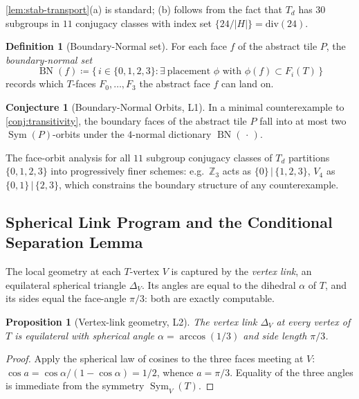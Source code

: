 \documentclass[11pt,a4paper]{article}
\theoremstyle{plain}
\newtheorem{proposition}[proposition]{Proposition}
\theoremstyle{definition}
\newtheorem{definition}[definition]{Definition}
\newtheorem{conjecture}[conjecture]{Conjecture}
\theoremstyle{remark}
\DeclareMathOperator{\Sym}{Sym}
\DeclareMathOperator{\BN}{BN}
\newcommand{\Td}{T_{\!d}}
\newcommand{\Z}{\mathbb{Z}}
\begin{document}
\cref{lem:stab-transport}(a) is standard; (b) follows from the fact that
$\Td$ has $30$ subgroups in $11$ conjugacy classes with index set
$\{24/|H|\} = \mathrm{div}(24)$.

\begin{definition}[Boundary-Normal set]\label{def:bn}
For each face $f$ of the abstract tile $P$, the \emph{boundary-normal set}
\[
  \BN(f) \coloneqq \bigl\{\, i \in \{0,1,2,3\}
          : \exists\ \text{placement } \phi \text{ with }
          \phi(f) \subset F_{i}(T) \,\bigr\}
\]
records which $T$-faces $F_{0},\ldots,F_{3}$ the abstract face $f$ can land
on.
\end{definition}

\begin{conjecture}[Boundary-Normal Orbits, L1]\label{conj:bn-orbits}
In a minimal counterexample to \cref{conj:transitivity}, the boundary faces
of the abstract tile $P$ fall into at most two $\Sym(P)$-orbits under the
$4$-normal dictionary $\BN(\,\cdot\,)$.
\end{conjecture}

The face-orbit analysis for all $11$ subgroup conjugacy classes of $\Td$
partitions $\{0,1,2,3\}$ into progressively finer schemes: e.g.\ $\Z_{3}$
acts as $\{0\}\,|\,\{1,2,3\}$, $V_{4}$ as $\{0,1\}\,|\,\{2,3\}$, which
constrains the boundary structure of any counterexample.

\subsection{Spherical Link Program and the Conditional Separation Lemma}
\label{ssec:spherical-link}

The local geometry at each $T$-vertex $V$ is captured by the \emph{vertex
link}, an equilateral spherical triangle $\Delta_{V}$.  Its angles are equal
to the dihedral $\alpha$ of $T$, and its sides equal the face-angle $\pi/3$:
both are exactly computable.

\begin{proposition}[Vertex-link geometry, L2]\label{prop:vertex-link}
The vertex link $\Delta_{V}$ at every vertex of $T$ is equilateral with
spherical angle $\alpha = \arccos(1/3)$ and side length $\pi/3$.
\end{proposition}

\begin{proof}
Apply the spherical law of cosines to the three faces meeting at $V$:
$\cos a = \cos\alpha/(1 - \cos\alpha) = 1/2$, whence $a = \pi/3$.  Equality of
the three angles is immediate from the symmetry $\Sym_{V}(T)$.
\end{proof}
\end{document}
